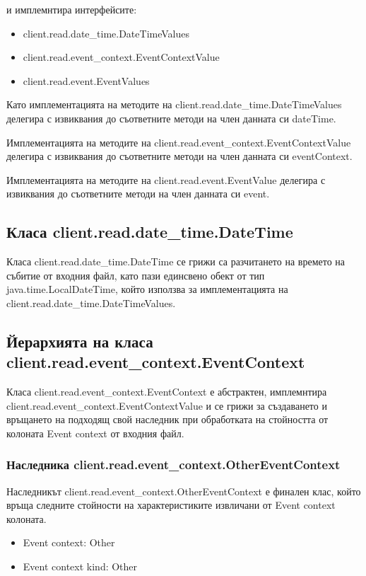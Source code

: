 \documentclass[a4paper, 12pt]{article}
\begin{document}
и имплемнтира интерфейсите:
\begin{itemize}
\item client.read.date\_time.DateTimeValues
\item client.read.event\_context.EventContextValue
\item client.read.event.EventValues
\end{itemize}

Като имплементацията на методите на client.read.date\_time.DateTimeValues делегира с извиквания до съответните методи на член данната си dateTime.

Имплементацията на методите на client.read.event\_context.EventContextValue делегира с извиквания до съответните методи на член данната си eventContext.

Имплементацията на методите на client.read.event.EventValue делегира с извиквания до съответните методи на член данната си event.

\subsection{Класа client.read.date\_time.DateTime}
Класа client.read.date\_time.DateTime се грижи са разчитането на времето на събитие от входния файл,
като пази единсвено обект от тип java.time.LocalDateTime, който използва за имплементацията на \\ client.read.date\_time.DateTimeValues.

\subsection{Йерархията на класа client.read.event\_context.EventContext}
Класа client.read.event\_context.EventContext е абстрактен,
имплемнтира client.read.event\_context.EventContextValue и се грижи за създаването и връщането на подходящ свой наследник при обработката на стойността от колоната Event context от входния файл.

\subsubsection{Наследника client.read.event\_context.OtherEventContext}
Наследникът client.read.event\_context.OtherEventContext е финален клас, който връща следните стойности на характеристиките извличани от Event context колоната.
\begin{itemize}
\item Event context: Other
\item Event context kind: Other
\end{itemize}
\end{document}
